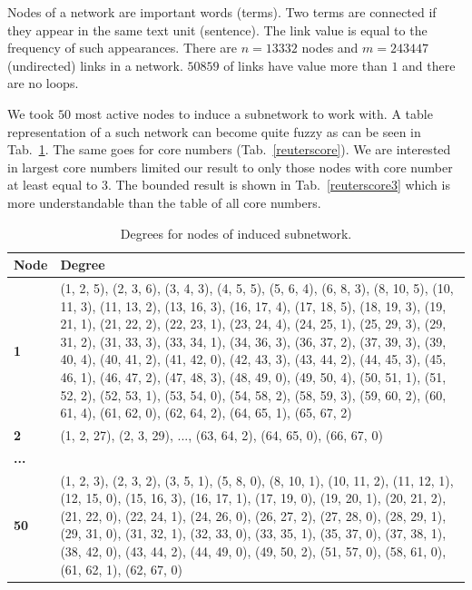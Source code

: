 \documentclass[a4paper,twoside,10pt]{article}
\begin{document}
Nodes of a network are important words (terms). Two terms are connected if they appear in the same text unit (sentence). The link value is equal to the frequency of such appearances.
There are $n = 13332$ nodes and $m = 243447$ (undirected) links in a network. $50859$ of links have value more than $1$ and there are no loops.

We took $50$ most active nodes to induce a subnetwork to work with. A table representation of a such network can become quite fuzzy as can be seen in Tab.~\ref{reutersdeg}. The same goes for core numbers (Tab.~\ref{reuterscore}). We are interested in largest core numbers limited our result to only those nodes with core number at least equal to $3$. The bounded result is shown in Tab.~\ref{reuterscore3} which is more understandable than the table of all core numbers.

\begin{center}
\begin{longtable}{p{}p{}}
\caption{Degrees for nodes of induced subnetwork.}
\label{reutersdeg}\\
\textbf{Node} & \textbf{Degree} \\
\endhead
\textbf{1} & (1, 2, 5), (2, 3, 6), (3, 4, 3), (4, 5, 5), (5, 6, 4), (6, 8, 3),
     (8, 10, 5), (10, 11, 3), (11, 13, 2), (13, 16, 3), (16, 17, 4), 
     (17, 18, 5), (18, 19, 3), (19, 21, 1), (21, 22, 2), (22, 23, 1), 
     (23, 24, 4), (24, 25, 1), (25, 29, 3), (29, 31, 2), (31, 33, 3), 
     (33, 34, 1), (34, 36, 3), (36, 37, 2), (37, 39, 3), (39, 40, 4), 
     (40, 41, 2), (41, 42, 0), (42, 43, 3), (43, 44, 2), (44, 45, 3), 
     (45, 46, 1), (46, 47, 2), (47, 48, 3), (48, 49, 0), (49, 50, 4), 
     (50, 51, 1), (51, 52, 2), (52, 53, 1), (53, 54, 0), (54, 58, 2), 
     (58, 59, 3), (59, 60, 2), (60, 61, 4), (61, 62, 0), (62, 64, 2), 
     (64, 65, 1), (65, 67, 2) \\
\textbf{2} & (1, 2, 27), (2, 3, 29), ..., (63, 64, 2), (64, 65, 0), (66, 67, 0) \\
\textbf{...} & \\
\textbf{50} & (1, 2, 3), (2, 3, 2), (3, 5, 1), (5, 8, 0), (8, 10, 1), (10, 11, 2), 
     (11, 12, 1), (12, 15, 0), (15, 16, 3), (16, 17, 1), (17, 19, 0), 
     (19, 20, 1), (20, 21, 2), (21, 22, 0), (22, 24, 1), (24, 26, 0), 
     (26, 27, 2), (27, 28, 0), (28, 29, 1), (29, 31, 0), (31, 32, 1), 
     (32, 33, 0), (33, 35, 1), (35, 37, 0), (37, 38, 1), (38, 42, 0), 
     (43, 44, 2), (44, 49, 0), (49, 50, 2), (51, 57, 0), (58, 61, 0), 
     (61, 62, 1), (62, 67, 0)
\end{longtable}
\end{center}
\end{document}
